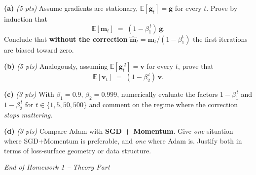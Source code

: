 \documentclass[11pt,letterpaper]{article}
\newcommand{\E}{\mathbb{E}}
\newcommand{\pts}[1]{\textit{(#1 pts)}\;}
\begin{document}
\textbf{(a)} \pts{5} Assume gradients are stationary, $\E[\mathbf{g}_t] = \mathbf{g}$
for every $t$. Prove by induction that
$$
\E[\mathbf{m}_t] \;=\; (1 - \beta_1^{\,t})\, \mathbf{g}.
$$
Conclude that \textbf{without the correction} $\hat{\mathbf{m}}_t = \mathbf{m}_t / (1 - \beta_1^t)$
the first iterations are biased toward zero.

\textbf{(b)} \pts{5} Analogously, assuming $\E[\mathbf{g}_t^{\,2}] = \mathbf{v}$
for every $t$, prove that
$$
\E[\mathbf{v}_t] \;=\; (1 - \beta_2^{\,t})\, \mathbf{v}.
$$

\textbf{(c)} \pts{3} With $\beta_1 = 0.9$, $\beta_2 = 0.999$, numerically
evaluate the factors $1 - \beta_1^{\,t}$ and $1 - \beta_2^{\,t}$ for
$t \in \{1, 5, 50, 500\}$ and comment on the regime where the correction
\emph{stops mattering}.

\textbf{(d)} \pts{3} Compare Adam with \textbf{SGD + Momentum}. Give
\emph{one} situation where SGD+Momentum is preferable, and \emph{one} where
Adam is. Justify both in terms of loss-surface geometry or data structure.

\vspace{1em}
\hrulefill

\begin{center}
\textit{End of Homework 1 -- Theory Part}
\end{center}
\end{document}
